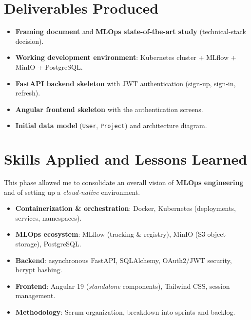 \documentclass[11pt,a4paper]{article}
\begin{document}
\section{Deliverables Produced}
\begin{itemize}[leftmargin=1.4em,itemsep=2pt]
  \item \textbf{Framing document} and \textbf{MLOps state-of-the-art study} (technical-stack decision).
  \item \textbf{Working development environment}: Kubernetes cluster + MLflow + MinIO + PostgreSQL.
  \item \textbf{FastAPI backend skeleton} with JWT authentication (sign-up, sign-in, refresh).
  \item \textbf{Angular frontend skeleton} with the authentication screens.
  \item \textbf{Initial data model} (\texttt{User}, \texttt{Project}) and architecture diagram.
\end{itemize}

\section{Skills Applied and Lessons Learned}
This phase allowed me to consolidate an overall vision of \textbf{MLOps
engineering} and of setting up a \emph{cloud-native} environment.
\begin{itemize}[leftmargin=1.4em,itemsep=2pt]
  \item \textbf{Containerization \& orchestration}: Docker, Kubernetes (deployments, services, namespaces).
  \item \textbf{MLOps ecosystem}: MLflow (tracking \& registry), MinIO (S3 object storage), PostgreSQL.
  \item \textbf{Backend}: asynchronous FastAPI, SQLAlchemy, OAuth2/JWT security, bcrypt hashing.
  \item \textbf{Frontend}: Angular 19 (\emph{standalone} components), Tailwind CSS, session management.
  \item \textbf{Methodology}: Scrum organization, breakdown into sprints and backlog.
\end{itemize}

\end{document}
